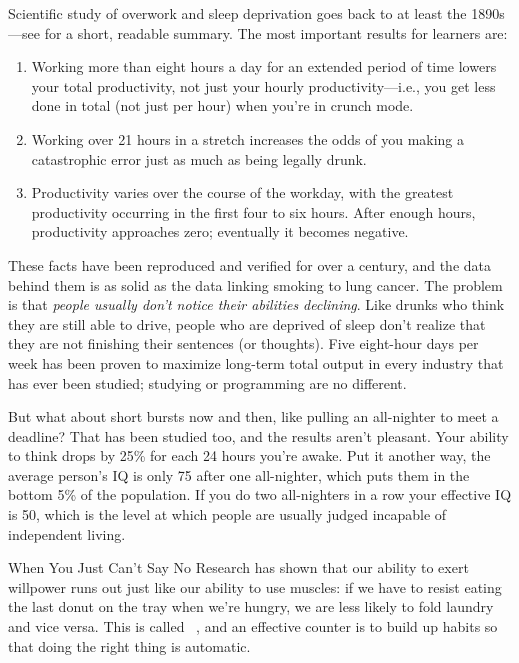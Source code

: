 Scientific study of overwork and sleep deprivation goes back to at least the 1890s---see
\cite{Robi2005} for a short, readable summary.
The most important results for learners are:

\begin{enumerate}

\item
  Working more than eight hours a day for an extended period of time
  lowers your total productivity,
  not just your hourly productivity---i.e.,
  you get less done in total (not just per hour)
  when you're in crunch mode.

\item
  Working over 21 hours in a stretch increases the odds of you making a catastrophic error
  just as much as being legally drunk.

\item
  Productivity varies over the course of the workday,
  with the greatest productivity occurring in the first four to six hours.
  After enough hours,
  productivity approaches zero;
  eventually it becomes negative.

\end{enumerate}

These facts have been reproduced and verified for over a century,
and the data behind them is as solid as the data linking smoking to lung cancer.
The problem is that
\emph{people usually don't notice their abilities declining}.
Like drunks who think they are still able to drive,
people who are deprived of sleep don't realize that
they are not finishing their sentences (or thoughts).
Five eight-hour days per week has been proven to maximize long-term total output
in every industry that has ever been studied;
studying or programming are no different.

But what about short bursts now and then,
like pulling an all-nighter to meet a deadline?
That has been studied too,
and the results aren't pleasant.
Your ability to think drops by 25\% for each 24 hours you're awake.
Put it another way,
the average person's IQ is only 75 after one all-nighter,
which puts them in the bottom 5\% of the population.
If you do two all-nighters in a row your effective IQ is 50,
which is the level at which people are usually judged incapable of independent living.

\begin{aside}{When You Just Can't Say No}
  Research has shown that our ability to exert willpower runs out
  just like our ability to use muscles:
  if we have to resist eating the last donut on the tray when we're hungry,
  we are less likely to fold laundry and vice versa.
  This is called ~\cite{Mill2016a},
  and an effective counter is to build up habits
  so that doing the right thing is automatic.
\end{aside}

